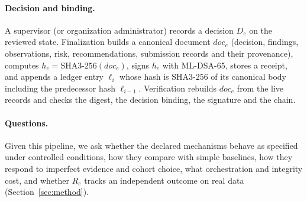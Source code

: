 \paragraph{Decision and binding.} A supervisor (or organization administrator)
records a decision $D_e$ on the reviewed state. Finalization builds a canonical
document $\mathit{doc}_e$ (decision, findings, observations, risk, recommendations,
submission records and their provenance), computes $h_e=\mathrm{SHA3\text{-}256}(\mathit{doc}_e)$,
signs $h_e$ with ML-DSA-65, stores a receipt, and appends a ledger entry
$\ell_i$ whose hash is $\mathrm{SHA3\text{-}256}$ of its canonical body including the
predecessor hash $\ell_{i-1}$. Verification rebuilds $\mathit{doc}_e$ from the live
records and checks the digest, the decision binding, the signature and the chain.

\paragraph{Questions.} Given this pipeline, we ask whether the declared mechanisms
behave as specified under controlled conditions, how they compare with simple
baselines, how they respond to imperfect evidence and cohort choice, what orchestration
and integrity cost, and whether $R_e$ tracks an independent outcome on real data
(Section~\ref{sec:method}).
